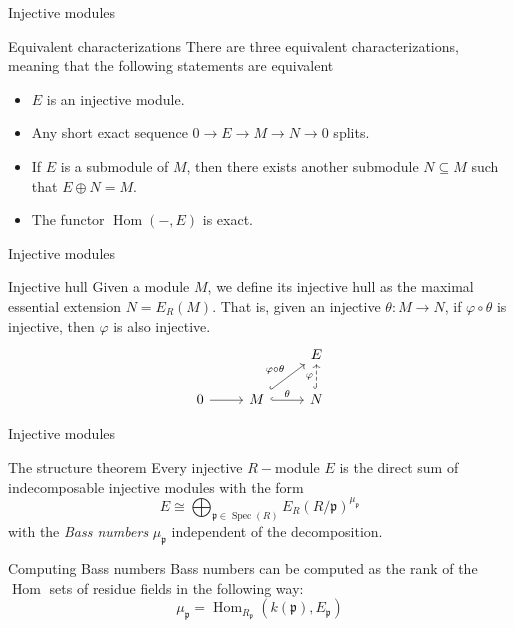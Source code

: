 \documentclass{beamer}
\DeclareMathOperator{\Hom}{Hom}
\DeclareMathOperator{\Spec}{Spec}
\begin{document}
\begin{frame}[fragile]{Injective modules}
\begin{block}{Equivalent characterizations}
There are three equivalent characterizations, meaning that the following statements are equivalent
\begin{itemize}
  \item $E$ is an injective module.
  \item Any short exact sequence $0\to E \to M \to N \to 0$ splits.
  \item If $E$ is a submodule of $M$, then there exists another submodule $N\subseteq M$ such that $E \oplus N = M$.
  \item The functor  $\Hom(-,E)$ is exact.
\end{itemize}
\end{block}
\end{frame}



\begin{frame}[fragile]{Injective modules}
\begin{block}{Injective hull}
Given a module $M$, we define its injective hull as the maximal essential extension $N = E_R(M)$. That is, given an injective $\theta :M\to N$, if $\varphi \circ \theta $  is injective, then $\varphi $ is also injective.
\[\begin{tikzcd}
	&& E \\
	0 & M & N
	\arrow[from=2-1, to=2-2]
	\arrow["\theta", hook, from=2-2, to=2-3]
	\arrow["\varphi", dashed, hook, from=2-3, to=1-3]
	\arrow["\varphi\circ\theta", hook, from=2-2, to=1-3]
\end{tikzcd}\]
\end{block}
\end{frame}


\begin{frame}[fragile]{Injective modules}
\begin{block}{The structure theorem}
Every injective $R-$module $E$ is the direct sum of indecomposable injective modules with the form
  \[
	E \cong \bigoplus _{\mathfrak{p}\in \Spec (R)} E_R( R / \mathfrak{p})^{\mu _{\mathfrak{p}}}
  \] 
with the \textit{Bass numbers} $\mu _{\mathfrak{p}}$ independent of the decomposition.
\end{block}
\begin{block}{Computing Bass numbers}
Bass numbers can be computed as the rank of the $\Hom$ sets of residue fields in the following way:
 \[
\mu _{\mathfrak{p}} =\Hom _{R_{\mathfrak{p}}}(k(\mathfrak{p}), E_{\mathfrak{p}})
\] 
\end{block}
\end{frame}
\end{document}
